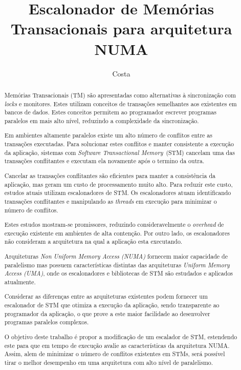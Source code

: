 \documentclass[diss-proposta,nocipinfo]{texufpel}
\title{Escalonador de Memórias Transacionais para arquitetura NUMA}
\author{Costa}{Michael Alexandre}
\begin{document}
\maketitle
\sloppy

\begin{abstract}

  Memórias Transacionais (TM) são apresentadas como alternativas à sincronização com \emph{locks} e monitores. Estes utilizam conceitos de transações semelhantes aos existentes em bancos de dados. Estes conceitos permitem ao programador escrever programas paralelos em mais alto nível, reduzindo a complexidade da sincronização.

  Em ambientes altamente paralelos existe um alto número de conflitos entre as transações executadas. Para solucionar estes conflitos e manter consistente a execução da aplicação, sistemas com \emph{Software Transactional Memory}~(STM) cancelam uma das transações conflitantes e executam ela novamente após o termino da outra.

  Cancelar as transações conflitantes são eficientes para manter a consistência da aplicação, mas geram um custo de processamento muito alto. Para reduzir este custo, estudos atuais utilizam escalonadores de STM. Os escalonadores atuam identificando transações conflitantes e manipulando as \emph{threads} em execução para minimizar o número de conflitos.

  Estes estudos mostram-se promissores, reduzindo consideravelmente o \emph{overhead} de execução existente em ambientes de alta contenção. Por outro lado, os escalonadores não consideram a arquitetura na qual a aplicação esta executando.

  Arquiteturas \emph{Non Uniform Memory Access (NUMA)} fornecem maior capacidade de paralelismo mas possuem características distintas das arquiteturas \emph{Uniform Memory Access (UMA)}, onde os escalonadores e bibliotecas de STM são estudados e aplicados atualmente.

  Considerar as diferenças entre as arquiteturas existentes podem fornecer um escalonador de STM que otimiza a execução da aplicação, sendo transparente ao programador da aplicação, o que prove a este maior facilidade ao desenvolver programas paralelos complexos.

  O objetivo deste trabalho é propor a modificação de um escalador de STM, estendendo este para que em tempo de execução avalie as características da arquitetura NUMA. Assim, alem de minimizar o número de conflitos existentes em STMs, será possível tirar o melhor desempenho em uma arquitetura com alto nível de paralelismo.

\end{abstract}
\end{document}
